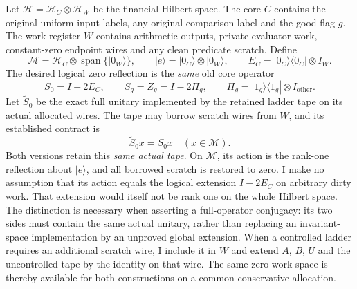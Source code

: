 Let $\mathcal H=\mathcal H_C\otimes\mathcal H_W$ be the financial
Hilbert space. The core $C$ contains the original uniform input labels,
any original comparison label and the good flag $g$. The work register
$W$ contains arithmetic outputs, private evaluator work, constant-zero
endpoint wires and any clean predicate scratch. Define
\begin{equation}
 \mathcal M=\mathcal H_C\otimes\operatorname{span}\{|0_W\rangle\},
 \qquad |e\rangle=|0_C\rangle\otimes|0_W\rangle,
 \qquad E_C=|0_C\rangle\langle0_C|\otimes I_W.
 \label{eq:conjugation-clean-space}
\end{equation}
The desired logical zero reflection is the \emph{same} old core operator
\begin{equation}
 S_0=I-2E_C,
 \qquad S_g=Z_g=I-2\Pi_g,
 \qquad \Pi_g=|1_g\rangle\langle1_g|\otimes I_{\mathrm{other}}.
 \label{eq:conjugation-reflections}
\end{equation}
Let $\widetilde S_0$ be the exact full unitary implemented by the
retained ladder tape on its actual allocated wires. The tape may borrow
scratch wires from $W$, and its established contract is
\begin{equation}
 \widetilde S_0x=S_0x\quad(x\in\mathcal M).
 \label{eq:conjugation-physical-zero-reflection}
\end{equation}
Both versions retain this \emph{same actual tape}. On $\mathcal M$,
its action is the rank-one reflection about $|e\rangle$, and all
borrowed scratch is restored to zero. I make no assumption that its
action equals the logical extension $I-2E_C$ on arbitrary dirty work.
That extension would itself not be rank one on the whole Hilbert
space. The distinction is necessary when asserting a full-operator
conjugacy: its two sides must contain the same actual unitary, rather
than replacing an invariant-space implementation by an unproved
global extension.
When a controlled ladder requires an additional scratch wire, I include
it in $W$ and extend $A$, $B$, $U$ and the uncontrolled tape by the
identity on that wire. The same zero-work space is thereby available
for both constructions on a common conservative allocation.

